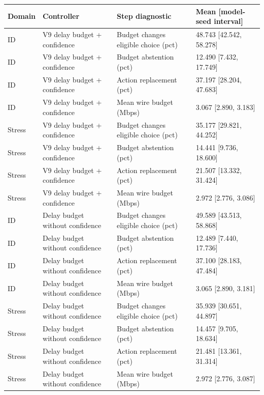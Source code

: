 \begin{tabular}{llll}
\toprule
Domain & Controller & Step diagnostic & Mean [model-seed interval] \\
\midrule
ID & V9 delay budget + confidence & Budget changes eligible choice (pct) & 48.743 [42.542, 58.278] \\
ID & V9 delay budget + confidence & Budget abstention (pct) & 12.490 [7.432, 17.749] \\
ID & V9 delay budget + confidence & Action replacement (pct) & 37.197 [28.204, 47.683] \\
ID & V9 delay budget + confidence & Mean wire budget (Mbps) & 3.067 [2.890, 3.183] \\
Stress & V9 delay budget + confidence & Budget changes eligible choice (pct) & 35.177 [29.821, 44.252] \\
Stress & V9 delay budget + confidence & Budget abstention (pct) & 14.441 [9.736, 18.600] \\
Stress & V9 delay budget + confidence & Action replacement (pct) & 21.507 [13.332, 31.424] \\
Stress & V9 delay budget + confidence & Mean wire budget (Mbps) & 2.972 [2.776, 3.086] \\
ID & Delay budget without confidence & Budget changes eligible choice (pct) & 49.589 [43.513, 58.868] \\
ID & Delay budget without confidence & Budget abstention (pct) & 12.489 [7.440, 17.736] \\
ID & Delay budget without confidence & Action replacement (pct) & 37.100 [28.183, 47.484] \\
ID & Delay budget without confidence & Mean wire budget (Mbps) & 3.065 [2.890, 3.181] \\
Stress & Delay budget without confidence & Budget changes eligible choice (pct) & 35.939 [30.651, 44.897] \\
Stress & Delay budget without confidence & Budget abstention (pct) & 14.457 [9.705, 18.634] \\
Stress & Delay budget without confidence & Action replacement (pct) & 21.481 [13.361, 31.314] \\
Stress & Delay budget without confidence & Mean wire budget (Mbps) & 2.972 [2.776, 3.087] \\
\bottomrule
\end{tabular}
